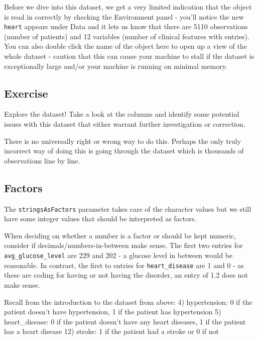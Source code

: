 \documentclass[
]{book}
\newenvironment{Shaded}{\begin{snugshade}}{\end{snugshade}}
\newcommand{\FunctionTok}[1]{\textcolor[rgb]{0.13,0.29,0.53}{\textbf{#1}}}
\newcommand{\NormalTok}[1]{#1}
\newcommand{\OtherTok}[1]{\textcolor[rgb]{0.56,0.35,0.01}{#1}}
\newcommand{\SpecialCharTok}[1]{\textcolor[rgb]{0.81,0.36,0.00}{\textbf{#1}}}
\begin{document}
Before we dive into this dataset, we get a very limited indication that the object is read in correctly by checking the Environment panel - you'll notice the new \texttt{heart} appears under Data and it lets us know that there are 5110 observations (number of patients) and 12 variables (number of clinical features with entries). You can also double click the name of the object here to open up a view of the whole dataset - caution that this can cause your machine to stall if the dataset is exceptionally large and/or your machine is running on minimal memory.

\subsection{Exercise}\label{exercise-5}

Explore the dataset! Take a look at the columns and identify some potential issues with this dataset that either warrant further investigation or correction.

There is no universally right or wrong way to do this. Perhaps the only truly incorrect way of doing this is going through the dataset which is thousands of observations line by line.

\subsection{Factors}\label{factors}

The \texttt{stringsAsFactors} parameter takes care of the character values but we still have some integer values that should be interpreted as factors.

When deciding on whether a number is a factor or should be kept numeric, consider if decimals/numbers-in-between make sense. The first two entries for \texttt{avg\_glucose\_level} are 229 and 202 - a glucose level in between would be reasonable. In contrast, the first to entries for \texttt{heart\_disease} are 1 and 0 - as these are coding for having or not having the disorder, an entry of 1.2 does not make sense.

Recall from the introduction to the dataset from above:
4) hypertension: 0 if the patient doesn't have hypertension, 1 if the patient has hypertension
5) heart\_disease: 0 if the patient doesn't have any heart diseases, 1 if the patient has a heart disease
12) stroke: 1 if the patient had a stroke or 0 if not

\begin{Shaded}
\end{Shaded}
\end{document}
